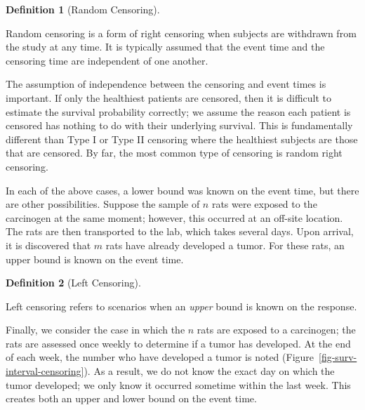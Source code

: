 \documentclass[
  letterpaper,
  DIV=11,
  numbers=noendperiod]{scrreprt}
\theoremstyle{definition}
\newtheorem{definition}{Definition}[chapter]
\theoremstyle{definition}
\theoremstyle{remark}
\begin{document}
\begin{definition}[Random
Censoring]\protect\hypertarget{def-random-censoring}{}\label{def-random-censoring}

Random censoring is a form of right censoring when subjects are
withdrawn from the study at any time. It is typically assumed that the
event time and the censoring time are independent of one another.

\end{definition}

The assumption of independence between the censoring and event times is
important. If only the healthiest patients are censored, then it is
difficult to estimate the survival probability correctly; we assume the
reason each patient is censored has nothing to do with their underlying
survival. This is fundamentally different than Type I or Type II
censoring where the healthiest subjects are those that are censored. By
far, the most common type of censoring is random right censoring.

In each of the above cases, a lower bound was known on the event time,
but there are other possibilities. Suppose the sample of \(n\) rats were
exposed to the carcinogen at the same moment; however, this occurred at
an off-site location. The rats are then transported to the lab, which
takes several days. Upon arrival, it is discovered that \(m\) rats have
already developed a tumor. For these rats, an upper bound is known on
the event time.

\begin{definition}[Left
Censoring]\protect\hypertarget{def-left-censoring}{}\label{def-left-censoring}

Left censoring refers to scenarios when an \emph{upper} bound is known
on the response.

\end{definition}

Finally, we consider the case in which the \(n\) rats are exposed to a
carcinogen; the rats are assessed once weekly to determine if a tumor
has developed. At the end of each week, the number who have developed a
tumor is noted (Figure~\ref{fig-surv-interval-censoring}). As a result,
we do not know the exact day on which the tumor developed; we only know
it occurred sometime within the last week. This creates both an upper
and lower bound on the event time.
\end{document}
